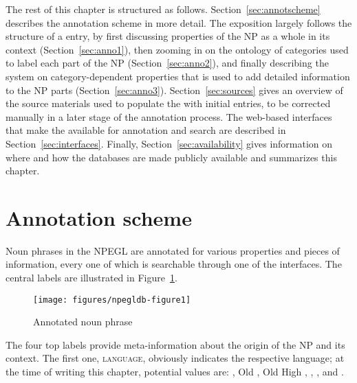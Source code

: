 \documentclass[output=paper,colorlinks,citecolor=brown]{langscibook}
\begin{document}
The rest of this chapter is structured as follows. Section~\ref{sec:annotscheme} describes the annotation scheme in more detail. The exposition largely follows the structure of a  entry, by first discussing properties of the NP as a whole in its context (Section~\ref{sec:anno1}), then zooming in on the ontology of categories used to label each part of the NP (Section~\ref{sec:anno2}), and finally describing the system on category-dependent properties that is used to add detailed information to the NP parts (Section~\ref{sec:anno3}). Section~\ref{sec:sources} gives an overview of the source materials used to populate the  with initial entries, to be corrected manually in a later stage of the annotation process. The web-based interfaces that make the  available for annotation and search are described in Section~\ref{sec:interfaces}. Finally, Section~\ref{sec:availability} gives information on where and how the databases are made publicly available and summarizes this chapter. 

\section{Annotation scheme\label{sec:annotscheme}}

\begin{sloppypar}
Noun phrases in the NPEGL  are annotated for various properties and pieces of information, every one of which is searchable through one of the  interfaces. The central labels are illustrated %
in Figure~\ref{fig:anotInt}. %
\end{sloppypar}

\begin{figure}[t]
\centering
\texttt{[image: figures/npegldb-figure1]}
\caption{Annotated noun phrase\label{fig:anotInt}}
\end{figure}


The four top labels provide meta-information about the origin of the NP and its context. The first one, \textsc{language}, obviously indicates the respective language; at the time of writing this chapter, potential values are: , Old , Old High , , , and .
\end{document}

